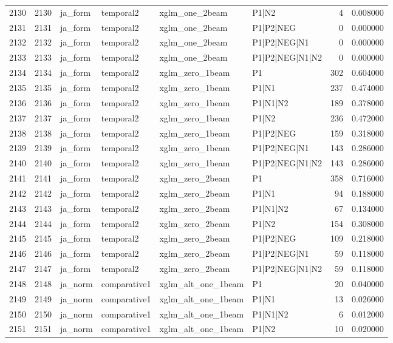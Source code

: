 \begin{tabular}{lrllllrr}
2130 & 2130 & ja_form & temporal2 & xglm_one_2beam & P1|N2 & 4 & 0.008000 \\
2131 & 2131 & ja_form & temporal2 & xglm_one_2beam & P1|P2|NEG & 0 & 0.000000 \\
2132 & 2132 & ja_form & temporal2 & xglm_one_2beam & P1|P2|NEG|N1 & 0 & 0.000000 \\
2133 & 2133 & ja_form & temporal2 & xglm_one_2beam & P1|P2|NEG|N1|N2 & 0 & 0.000000 \\
2134 & 2134 & ja_form & temporal2 & xglm_zero_1beam & P1 & 302 & 0.604000 \\
2135 & 2135 & ja_form & temporal2 & xglm_zero_1beam & P1|N1 & 237 & 0.474000 \\
2136 & 2136 & ja_form & temporal2 & xglm_zero_1beam & P1|N1|N2 & 189 & 0.378000 \\
2137 & 2137 & ja_form & temporal2 & xglm_zero_1beam & P1|N2 & 236 & 0.472000 \\
2138 & 2138 & ja_form & temporal2 & xglm_zero_1beam & P1|P2|NEG & 159 & 0.318000 \\
2139 & 2139 & ja_form & temporal2 & xglm_zero_1beam & P1|P2|NEG|N1 & 143 & 0.286000 \\
2140 & 2140 & ja_form & temporal2 & xglm_zero_1beam & P1|P2|NEG|N1|N2 & 143 & 0.286000 \\
2141 & 2141 & ja_form & temporal2 & xglm_zero_2beam & P1 & 358 & 0.716000 \\
2142 & 2142 & ja_form & temporal2 & xglm_zero_2beam & P1|N1 & 94 & 0.188000 \\
2143 & 2143 & ja_form & temporal2 & xglm_zero_2beam & P1|N1|N2 & 67 & 0.134000 \\
2144 & 2144 & ja_form & temporal2 & xglm_zero_2beam & P1|N2 & 154 & 0.308000 \\
2145 & 2145 & ja_form & temporal2 & xglm_zero_2beam & P1|P2|NEG & 109 & 0.218000 \\
2146 & 2146 & ja_form & temporal2 & xglm_zero_2beam & P1|P2|NEG|N1 & 59 & 0.118000 \\
2147 & 2147 & ja_form & temporal2 & xglm_zero_2beam & P1|P2|NEG|N1|N2 & 59 & 0.118000 \\
2148 & 2148 & ja_norm & comparative1 & xglm_alt_one_1beam & P1 & 20 & 0.040000 \\
2149 & 2149 & ja_norm & comparative1 & xglm_alt_one_1beam & P1|N1 & 13 & 0.026000 \\
2150 & 2150 & ja_norm & comparative1 & xglm_alt_one_1beam & P1|N1|N2 & 6 & 0.012000 \\
2151 & 2151 & ja_norm & comparative1 & xglm_alt_one_1beam & P1|N2 & 10 & 0.020000 \\

\end{tabular}
